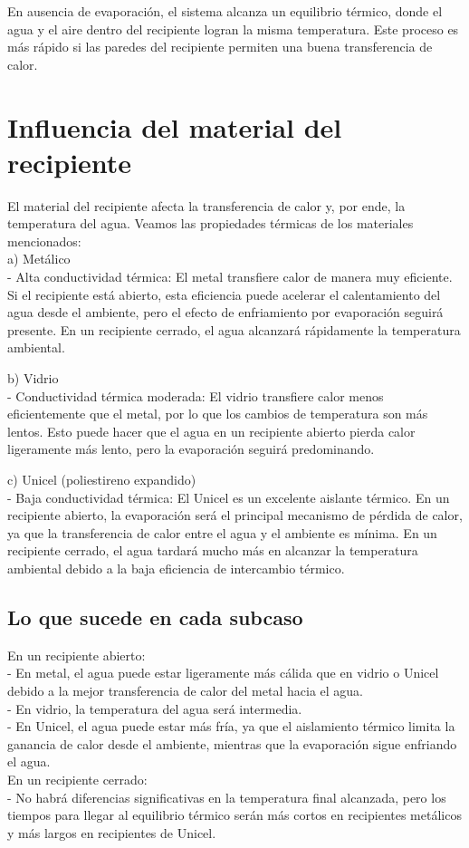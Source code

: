\documentclass[article,12pt]{elsarticle}
\begin{document}
En ausencia de evaporación, el sistema alcanza un equilibrio térmico, donde el agua y el aire dentro del recipiente logran la misma temperatura. Este proceso es más rápido si las paredes del recipiente permiten una buena transferencia de calor.

\section{Influencia del material del recipiente}
El material del recipiente afecta la transferencia de calor y, por ende, la temperatura del agua. Veamos las propiedades térmicas de los materiales mencionados: \\

a) Metálico \\
- Alta conductividad térmica: El metal transfiere calor de manera muy eficiente. Si el recipiente está abierto, esta eficiencia puede acelerar el calentamiento del agua desde el ambiente, pero el efecto de enfriamiento por evaporación seguirá presente. En un recipiente cerrado, el agua alcanzará rápidamente la temperatura ambiental.

b) Vidrio \\
- Conductividad térmica moderada: El vidrio transfiere calor menos eficientemente que el metal, por lo que los cambios de temperatura son más lentos. Esto puede hacer que el agua en un recipiente abierto pierda calor ligeramente más lento, pero la evaporación seguirá predominando.

c) Unicel (poliestireno expandido) \\
- Baja conductividad térmica: El Unicel es un excelente aislante térmico. En un recipiente abierto, la evaporación será el principal mecanismo de pérdida de calor, ya que la transferencia de calor entre el agua y el ambiente es mínima. En un recipiente cerrado, el agua tardará mucho más en alcanzar la temperatura ambiental debido a la baja eficiencia de intercambio térmico.

\subsection{Lo que sucede en cada subcaso}
En un recipiente abierto:\\
- En metal, el agua puede estar ligeramente más cálida que en vidrio o Unicel debido a la mejor transferencia de calor del metal hacia el agua.\\
- En vidrio, la temperatura del agua será intermedia.\\
- En Unicel, el agua puede estar más fría, ya que el aislamiento térmico limita la ganancia de calor desde el ambiente, mientras que la evaporación sigue enfriando el agua.\\

En un recipiente cerrado:\\
- No habrá diferencias significativas en la temperatura final alcanzada, pero los tiempos para llegar al equilibrio térmico serán más cortos en recipientes metálicos y más largos en recipientes de Unicel.
\end{document}
